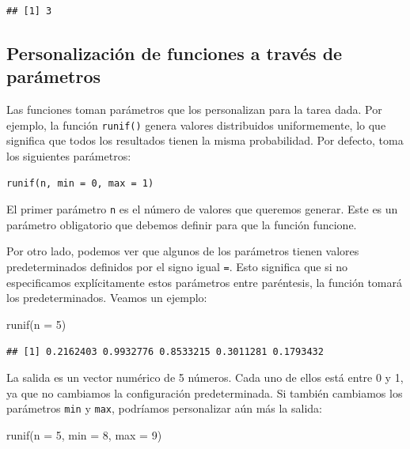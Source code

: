 \documentclass[
]{book}
\newenvironment{Shaded}{\begin{snugshade}}{\end{snugshade}}
\newcommand{\AttributeTok}[1]{\textcolor[rgb]{0.77,0.63,0.00}{#1}}
\newcommand{\DecValTok}[1]{\textcolor[rgb]{0.00,0.00,0.81}{#1}}
\newcommand{\FunctionTok}[1]{\textcolor[rgb]{0.00,0.00,0.00}{#1}}
\newcommand{\NormalTok}[1]{#1}
\begin{document}
\begin{verbatim}
## [1] 3
\end{verbatim}

\hypertarget{personalizaciuxf3n-de-funciones-a-travuxe9s-de-paruxe1metros}{%
\subsection{Personalización de funciones a través de parámetros}\label{personalizaciuxf3n-de-funciones-a-travuxe9s-de-paruxe1metros}}

Las funciones toman parámetros que los personalizan para la tarea dada. Por ejemplo, la función \texttt{runif()} genera valores distribuidos uniformemente, lo que significa que todos los resultados tienen la misma probabilidad. Por defecto, toma los siguientes parámetros:

\begin{verbatim}
runif(n, min = 0, max = 1)
\end{verbatim}

El primer parámetro \texttt{n} es el número de valores que queremos generar. Este es un parámetro obligatorio que debemos definir para que la función funcione.

Por otro lado, podemos ver que algunos de los parámetros tienen valores predeterminados definidos por el signo igual \texttt{=}. Esto significa que si no especificamos explícitamente estos parámetros entre paréntesis, la función tomará los predeterminados. Veamos un ejemplo:

\begin{Shaded}
\begin{Highlighting}[]
\FunctionTok{runif}\NormalTok{(}\AttributeTok{n =} \DecValTok{5}\NormalTok{)}
\end{Highlighting}
\end{Shaded}

\begin{verbatim}
## [1] 0.2162403 0.9932776 0.8533215 0.3011281 0.1793432
\end{verbatim}

La salida es un vector numérico de 5 números. Cada uno de ellos está entre 0 y 1, ya que no cambiamos la configuración predeterminada. Si también cambiamos los parámetros \texttt{min} y \texttt{max}, podríamos personalizar aún más la salida:

\begin{Shaded}
\begin{Highlighting}[]
\FunctionTok{runif}\NormalTok{(}\AttributeTok{n =} \DecValTok{5}\NormalTok{, }\AttributeTok{min =} \DecValTok{8}\NormalTok{, }\AttributeTok{max =} \DecValTok{9}\NormalTok{)}
\end{Highlighting}
\end{Shaded}
\end{document}
